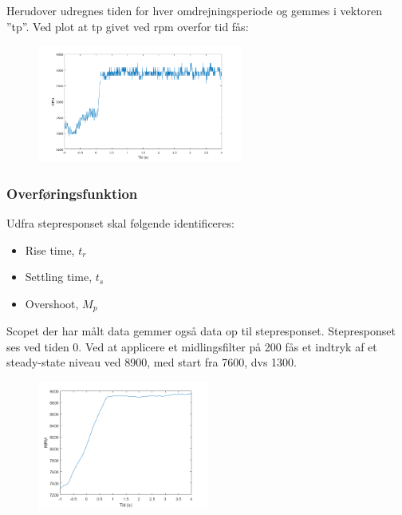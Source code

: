 Herudover udregnes tiden for hver omdrejningsperiode og gemmes i vektoren ”tp”.
Ved plot at tp givet ved rpm overfor tid fås:

\begin{figure}[h]
  \centering
  \includegraphics[width=0.6\textwidth]{./figurer/mo3.png}
  \caption{}
  \label{fig:mo3}
\end{figure}

\subsubsection{Overføringsfunktion}

\label{sec:overforingsfunktion}
Udfra stepresponset skal følgende identificeres:

\begin{itemize}
\item Rise time, $t_r$
\item Settling time, $t_s$
\item Overshoot, $M_p$
\end{itemize}

Scopet der har målt data gemmer også data op til stepresponset. Stepresponset ses ved tiden 0.
Ved at applicere et midlingsfilter på 200 fås et indtryk af et steady-state niveau ved 8900, med start fra 7600, dvs 1300. 

\begin{figure}[h]
  \centering
  \includegraphics[width=0.5\textwidth]{./figurer/mo4.png}
  \caption{}
  \label{fig:mo4}
\end{figure}

